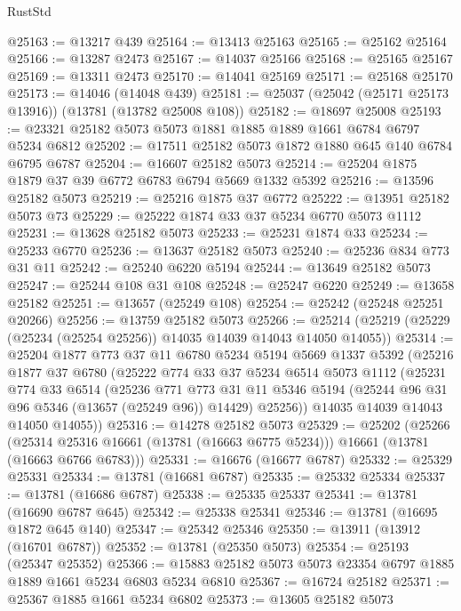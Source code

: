 \begin{lexlean}{RustStd}
\begin{coremodule}
@25163 := @13217 @439
@25164 := @13413 @25163
@25165 := @25162 @25164
@25166 := @13287 @2473
@25167 := @14037 @25166
@25168 := @25165 @25167
@25169 := @13311 @2473
@25170 := @14041 @25169
@25171 := @25168 @25170
@25173 := @14046 (@14048 @439)
@25181 := @25037 (@25042 (@25171 @25173 @13916)) (@13781 (@13782 @25008 @108))
@25182 := @18697 @25008
@25193 := @23321 @25182 @5073 @5073 @1881 @1885 @1889 @1661 @6784 @6797 @5234 @6812
@25202 := @17511 @25182 @5073 @1872 @1880 @645 @140 @6784 @6795 @6787
@25204 := @16607 @25182 @5073
@25214 := @25204 @1875 @1879 @37 @39 @6772 @6783 @6794 @5669 @1332 @5392
@25216 := @13596 @25182 @5073
@25219 := @25216 @1875 @37 @6772
@25222 := @13951 @25182 @5073 @73
@25229 := @25222 @1874 @33 @37 @5234 @6770 @5073 @1112
@25231 := @13628 @25182 @5073
@25233 := @25231 @1874 @33
@25234 := @25233 @6770
@25236 := @13637 @25182 @5073
@25240 := @25236 @834 @773 @31 @11
@25242 := @25240 @6220 @5194
@25244 := @13649 @25182 @5073
@25247 := @25244 @108 @31 @108
@25248 := @25247 @6220
@25249 := @13658 @25182
@25251 := @13657 (@25249 @108)
@25254 := @25242 (@25248 @25251 @20266)
@25256 := @13759 @25182 @5073
@25266 := @25214 (@25219 (@25229 (@25234 (@25254 @25256)) @14035 @14039 @14043 @14050 @14055))
@25314 := @25204
    @1877
    @773
    @37
    @11
    @6780
    @5234
    @5194
    @5669
    @1337
    @5392
    (@25216
      @1877
      @37
      @6780
      (@25222
        @774
        @33
        @37
        @5234
        @6514
        @5073
        @1112
        (@25231
          @774
          @33
          @6514
          (@25236
            @771
            @773
            @31
            @11
            @5346
            @5194
            (@25244 @96 @31 @96 @5346 (@13657 (@25249 @96)) @14429)
            @25256))
        @14035
        @14039
        @14043
        @14050
        @14055))
@25316 := @14278 @25182 @5073
@25329 := @25202
    (@25266
      (@25314 @25316 @16661 (@13781 (@16663 @6775 @5234)))
      @16661
      (@13781 (@16663 @6766 @6783)))
@25331 := @16676 (@16677 @6787)
@25332 := @25329 @25331
@25334 := @13781 (@16681 @6787)
@25335 := @25332 @25334
@25337 := @13781 (@16686 @6787)
@25338 := @25335 @25337
@25341 := @13781 (@16690 @6787 @645)
@25342 := @25338 @25341
@25346 := @13781 (@16695 @1872 @645 @140)
@25347 := @25342 @25346
@25350 := @13911 (@13912 (@16701 @6787))
@25352 := @13781 (@25350 @5073)
@25354 := @25193 (@25347 @25352)
@25366 := @15883 @25182 @5073 @5073 @23354 @6797 @1885 @1889 @1661 @5234 @6803 @5234 @6810
@25367 := @16724 @25182
@25371 := @25367 @1885 @1661 @5234 @6802
@25373 := @13605 @25182 @5073

\end{coremodule}
\end{lexlean}
